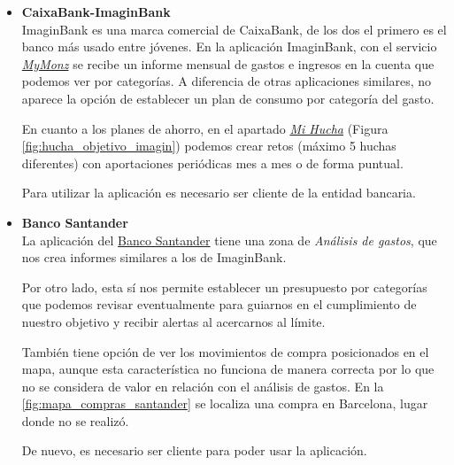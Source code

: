 \begin{itemize}

    \item \textbf{CaixaBank-ImaginBank} \\
    ImaginBank es una marca comercial de CaixaBank, de los dos el primero es el banco más usado entre jóvenes. 
    En la aplicación ImaginBank, con el servicio \href{https://www.imagin.com/app/mymonz}{\textit{MyMonz}} se recibe un informe mensual de gastos e ingresos en la cuenta que podemos ver por categorías. 
    A diferencia de otras aplicaciones similares, no aparece la opción de 
    establecer un plan de consumo por categoría del gasto.

    En cuanto a los planes de ahorro, en el apartado \href{https://www.imagin.com/ahorro/retos-ahorro}{\textit{Mi Hucha}} (Figura \ref{fig:hucha_objetivo_imagin}) podemos crear 
    retos (máximo 5 huchas diferentes) con aportaciones periódicas mes a mes o de forma puntual.

    Para utilizar la aplicación es necesario ser cliente de la entidad bancaria.

    \item \textbf{Banco Santander}\\
    La aplicación del \href{https://www.bancosantander.es/particulares/banca-online/apps/santander}{Banco Santander}
    tiene una zona de \textit{Análisis de gastos}, que nos crea informes similares a los de ImaginBank. 

    Por otro lado, esta sí nos permite establecer un presupuesto por categorías que podemos revisar eventualmente para guiarnos en el cumplimiento de nuestro objetivo y recibir alertas al acercarnos al límite.

    También tiene opción de ver los movimientos de compra posicionados en el mapa, aunque esta característica no funciona de manera correcta por lo que no se considera de valor en relación con el análisis de gastos. En la  \ref{fig:mapa_compras_santander} se localiza una compra en Barcelona, lugar donde no se realizó.

    De nuevo, es necesario ser cliente para poder usar la aplicación.


\end{itemize}
